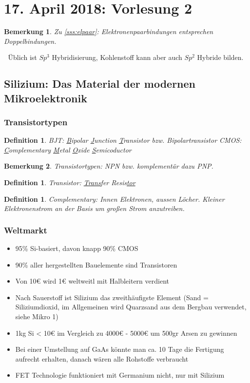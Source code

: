 \documentclass[12pt,a4paper]{report}%
\newtheorem{definition}[satz]{Definition}
\newtheorem{bem}{Bemerkung}[section]
\numberwithin{equation}{section}
\def\ul#1{\underline{#1}}
\def\€{\euro{}}
\numberwithin{equation}{subsection}
\begin{document}
\section{17. April 2018: Vorlesung 2}
		\begin{bem}
		  Zu \eqref{sss:elpaar}: Elektronenpaarbindungen entsprechen Doppelbindungen.
		\end{bem}
		$\;$\newline
		Üblich ist $Sp^3$ Hybridisierung, Kohlenstoff kann aber auch $Sp^2$ Hybride bilden.
		
		\subsection{Silizium: Das Material der modernen Mikroelektronik}
		\subsubsection{Transistortypen}
		\begin{definition}
		  BJT: \ul{B}ipolar \ul{J}unction \ul{T}ransistor bzw. Bipolartransistor\newline
		  CMOS: \ul{C}omplementary \ul{M}etal \ul{O}xide \ul{S}emicoductor
		\end{definition}
		\begin{bem}
		  Transistortypen: NPN bzw. komplementär dazu PNP.
		\end{bem}
		\begin{definition}
		  Transistor: \ul{Trans}fer Resis\ul{tor}
		\end{definition}
		\begin{definition}
		  Complementary: Innen Elektronen, aussen Löcher. Kleiner Elektronenstrom an der Basis um großen Strom anzutreiben. 
		\end{definition}
		
		\subsubsection{Weltmarkt}
		\begin{itemize}
		  \item 95\% Si-basiert, davon knapp 90\% CMOS
		  \item 90\% aller hergestellten Bauelemente sind Transistoren
		  \item Von 10\€ wird 1\€ weltweitl mit Halbleitern verdient
		  \item Nach Sauerstoff ist Silizium das zweithäufigste Element (Sand = Siliziumdioxid, im Allgemeinen wird Quarzsand aus dem Bergbau verwendet, siehe Mikro 1)
		  \item 1kg Si < 10\€ im Vergleich zu 4000\€ - 5000\€ um 500gr Arsen zu gewinnen
		  \item Bei einer Umstellung auf GaAs könnte man ca. 10 Tage die Fertigung aufrecht erhalten, danach wären alle Rohstoffe verbraucht
		  \item FET Technologie funktioniert mit Germanium nicht, nur mit Silizium
		\end{itemize}
		
\end{document}
